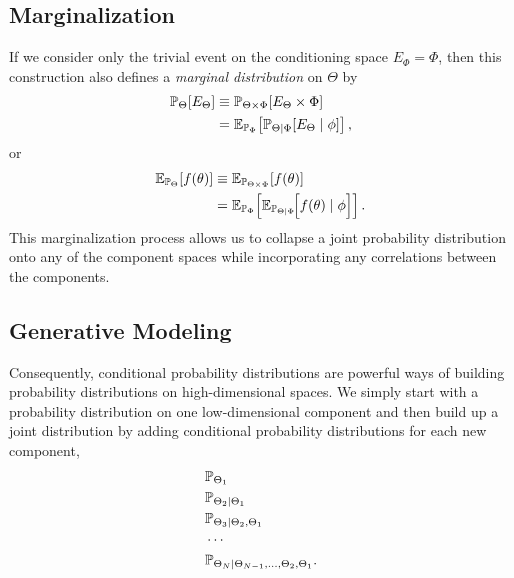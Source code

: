 \subsection{Marginalization}

If we consider only the trivial event on the conditioning space $E_{\Phi} 
= \Phi$, then this construction also defines a  \emph{marginal distribution} 
on $\Theta$ by
%
\begin{align*}
\mathbb{P}_{\Theta} \! \left[ E_{\Theta} \right]
&\equiv
\mathbb{P}_{\Theta \times \Phi} \! \left[ E_{\Theta} \times \Phi \right] \\
&=
\mathbb{E}_{\mathbb{P}_{\Phi}} \! \left[  
\mathbb{P}_{\Theta|\Phi} \! \left[ E_{\Theta} \mid \phi \right]
\right],
\end{align*}
or
%
\begin{align*}
\mathbb{E}_{\mathbb{P}_{\Theta}} \! \left[ f \! \left( \theta \right) \right]
&\equiv
\mathbb{E}_{\mathbb{P}_{\Theta \times \Phi}} \! \left[ f \! \left( \theta \right) \right] \\
&=
\mathbb{E}_{\mathbb{P}_{\Phi}} \! \left[  
\mathbb{E}_{\mathbb{P}_{\Theta|\Phi}} \! \Big[ 
f \! \left( \theta \right) \mid \phi 
\Big]
\right].
\end{align*}
%
This marginalization process allows us to collapse a joint probability 
distribution onto any of the component spaces while incorporating 
any correlations between the components.

\subsection{Generative Modeling}

Consequently, conditional probability distributions are powerful ways of
building probability distributions on high-dimensional spaces.  We simply 
start with a probability distribution on one low-dimensional component and 
then build up a joint distribution by adding conditional probability distributions 
for each new component,
%
\begin{align*}
& \mathbb{P}_{\Theta_{1}} \\
& \mathbb{P}_{\Theta_{2} \mid \Theta_{1}} \\
& \mathbb{P}_{\Theta_{3} \mid \Theta_{2}, \Theta_{1}} \\
& \cdots \\
& \mathbb{P}_{\Theta_{N} \mid \Theta_{N - 1}, \ldots, \Theta_{2}, \Theta_{1}}.
\end{align*}

